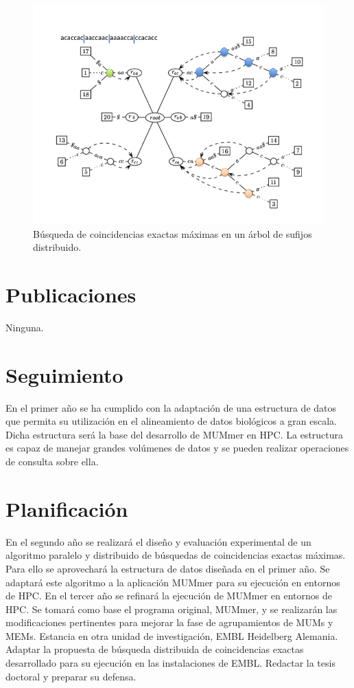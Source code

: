\documentclass[11pt,a4paper,english]{article}
\begin{document}
\begin{figure}[h] 
\begin{center}
\includegraphics[scale=0.4]{dst_search.png}
\caption{Búsqueda de coincidencias exactas máximas en un árbol de sufijos distribuido.}
\label{fig:dst_search}
\end{center}
\end{figure}

\section{Publicaciones}
\noindent
Ninguna.
\section{Seguimiento}
En el primer año se ha cumplido con la adaptación de una estructura de datos que permita su utilización
en el alineamiento de datos biológicos a gran escala. Dicha estructura será la base del desarrollo de MUMmer en HPC.
La estructura es capaz de manejar grandes volúmenes de datos y se pueden realizar operaciones de consulta sobre ella.
\section{Planificación}
En el segundo año se realizará el diseño y evaluación experimental de un algoritmo paralelo y distribuido de búsquedas de 
coincidencias exactas máximas. Para ello se aprovechará la estructura de datos diseñada en el primer año. Se adaptará este
algoritmo a la aplicación MUMmer para su ejecución en entornos de HPC.
En el tercer año se refinará la ejecución de MUMmer en entornos de HPC. Se tomará como base el programa original, MUMmer, y 
se realizarán las modificaciones pertinentes para mejorar la fase de agrupamientos de MUMs y MEMs. Estancia en otra unidad 
de investigación, EMBL Heidelberg Alemania. Adaptar la propuesta de búsqueda distribuida de coincidencias exactas desarrollado para su
ejecución en las instalaciones de EMBL. Redactar la tesis doctoral y preparar su defensa.
\end{document}
